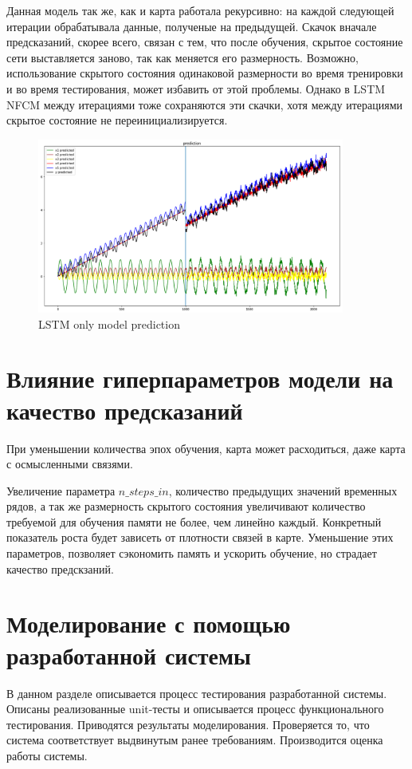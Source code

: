 Данная модель так же, как и карта работала рекурсивно:
на каждой следующей итерации обрабатывала данные, полученые на предыдущей.
Скачок вначале предсказаний, скорее всего, связан с тем, что после обучения,
скрытое состояние сети выставляется заново, так как меняется его размерность.
Возможно, использование скрытого состояния одинаковой размерности во время
тренировки и во время тестирования, может избавить от этой проблемы. Однако
в LSTM NFCM между итерациями тоже сохраняются эти скачки, хотя между итерациями
скрытое состояние не переинициализируется.

\begin{figure}
	\centering
	\includegraphics[width=0.9\textwidth]{./img/lstm_only_prediction.png}
	\caption{LSTM only model prediction}
	\label{pic:lstm_only_prediction}
\end{figure}


\section{Влияние гиперпараметров модели на качество предсказаний}


При уменьшении количества эпох обучения, карта может расходиться, даже карта с осмысленными связями.

Увеличение параметра $ n\_steps\_in $, количество предыдущих значений временных рядов,
а так же размерность скрытого состояния увеличивают количество требуемой для обучения
памяти не более, чем линейно каждый. Конкретный показатель роста будет зависеть от
плотности связей в карте.
Уменьшение этих параметров, позволяет сэкономить память и ускорить обучение,
но страдает качество предскзаний.


\section{Моделирование с помощью разработанной системы}
\begin{annotation}
	В данном разделе описывается процесс тестирования разработанной системы.
	Описаны реализованные unit-тесты и описывается процесс функционального тестирования.
	Приводятся результаты моделирования. Проверяется то, что система соответствует выдвинутым ранее требованиям.
	Производится оценка работы системы.
\end{annotation}

